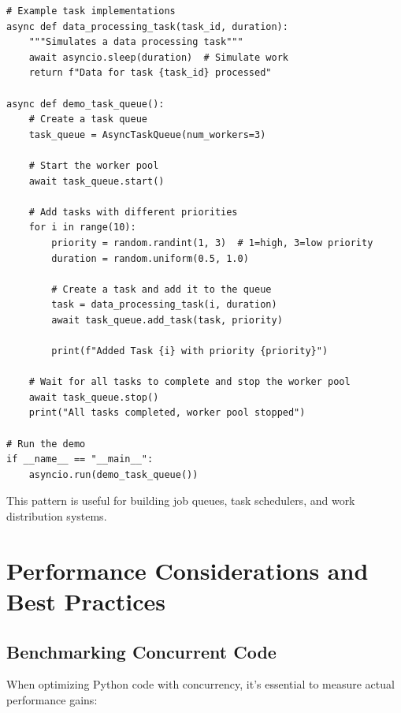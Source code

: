 \documentclass[12pt,letterpaper]{article}
\newenvironment{macterminal}{%
    \begin{mdframed}[
        linecolor=terminalFrame,
        backgroundcolor=terminalBg,
        roundcorner=5pt,
        skipabove=10pt,
        skipbelow=10pt,
        linewidth=1pt,
        innertopmargin=10pt, %
        frametitle={%
            \tikz[baseline=(current bounding box.east), outer sep=0pt]{
                \fill[red!80!black] (0,0) circle (5pt);
                \fill[yellow!80!black] (0.7,0) circle (5pt);
                \fill[green!70!black] (1.4,0) circle (5pt);
            }
        },
        frametitlealignment=\raggedright, %
        frametitleaboveskip=8pt, %
        frametitlebelowskip=0pt, %
    ]
}{%
    \end{mdframed}%
}
\begin{document}
\begin{macterminal}
\begin{lstlisting}
# Example task implementations
async def data_processing_task(task_id, duration):
    """Simulates a data processing task"""
    await asyncio.sleep(duration)  # Simulate work
    return f"Data for task {task_id} processed"

async def demo_task_queue():
    # Create a task queue
    task_queue = AsyncTaskQueue(num_workers=3)
    
    # Start the worker pool
    await task_queue.start()
    
    # Add tasks with different priorities
    for i in range(10):
        priority = random.randint(1, 3)  # 1=high, 3=low priority
        duration = random.uniform(0.5, 1.0)
        
        # Create a task and add it to the queue
        task = data_processing_task(i, duration)
        await task_queue.add_task(task, priority)
        
        print(f"Added Task {i} with priority {priority}")
    
    # Wait for all tasks to complete and stop the worker pool
    await task_queue.stop()
    print("All tasks completed, worker pool stopped")

# Run the demo
if __name__ == "__main__":
    asyncio.run(demo_task_queue())
\end{lstlisting}
\end{macterminal}

This pattern is useful for building job queues, task schedulers, and work distribution systems.

\section{Performance Considerations and Best Practices}

\subsection{Benchmarking Concurrent Code}

When optimizing Python code with concurrency, it's essential to measure actual performance gains:
\end{document}
